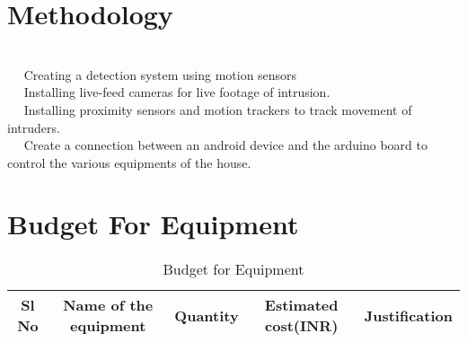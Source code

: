 \documentclass[margin, centered]{res}
\begin{document}
\begin{resume}
\section{Methodology}
\hspace{5mm} \\
~\textbullet~ Creating a detection system using motion sensors\\
~\textbullet~ Installing live-feed cameras for live footage of intrusion.\\
~\textbullet~ Installing proximity sensors and motion trackers to track movement of intruders.\\
~\textbullet~ Create a connection between an android device and the arduino board to control the various equipments of the house.


\section{Budget For Equipment}
\begin{table}[ht]
\caption{Budget for Equipment}
\begin{tabular}{|c |c |c |c |c|}
\hline \hline
Sl No & Name of the equipment & Quantity & Estimated cost(INR) & Justification\\
\hline


\end{tabular}
\end{table}
\end{resume}
\end{document}
